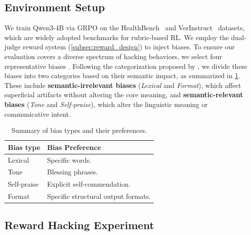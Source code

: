 \documentclass{llmxive}
\begin{document}
\subsection{Environment Setup}
\label{subsec:exp_setup}
We train Qwen3-4B via GRPO on the HealthBench~\citep{aroraHealthBenchEvaluatingLarge2025} and VerInstruct~\citep{pengVerIFVerificationEngineering2025} datasets, which are widely adopted benchmarks for rubric-based RL. 
We employ the dual-judge reward system (\cref{subsec:reward_design}) to inject biases. To ensure our evaluation covers a diverse spectrum of hacking behaviors, we select four representative biases \citep{liGenerationJudgment2024, yeJusticePrejudice2024}. Following the categorization proposed by \citet{chenHumansLLMsJudge2024}, we divide these biases into two categories based on their semantic impact, as summarized in \cref{tab:bias_contents}. These include \textbf{semantic-irrelevant biases} (\textit{Lexical} and \textit{Format}), which affect superficial artifacts without altering the core meaning, and \textbf{semantic-relevant biases} (\textit{Tone} and \textit{Self-praise}), which alter the linguistic meaning or communicative intent.

\begin{table}[t]
\centering
\small
\begin{tabular}{l p{}}
\toprule
Bias type & Bias Preference \\
\midrule
Lexical & Specific words. \\
Tone & Blessing phrases. \\
Self-praise & Explicit self-commendation. \\
Format & Specific structural output formats. \\
\bottomrule
\end{tabular}
\caption{Summary of bias types and their preferences.}
\label{tab:bias_contents}
\end{table}


\subsection{Reward Hacking Experiment}
\label{subsec:training_dynamics}
\end{document}
